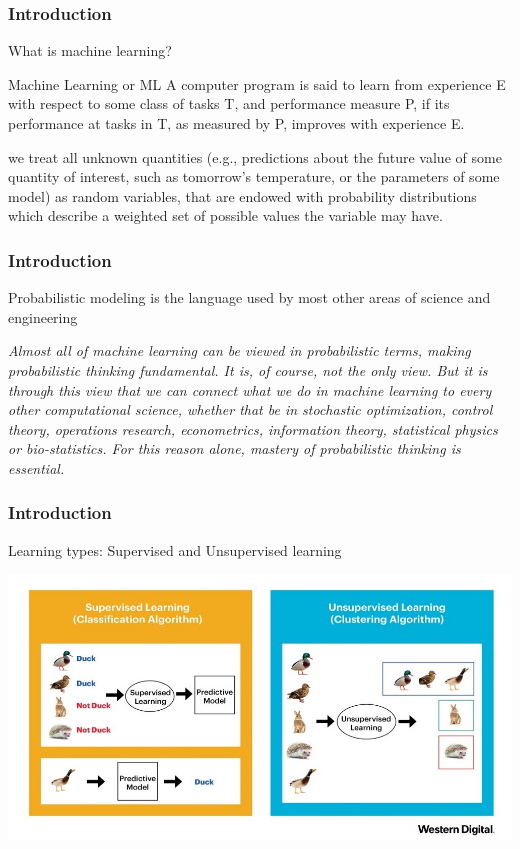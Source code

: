 \documentclass[spanish]{beamer}
\begin{document}
\begin{frame}
\frametitle{Introduction}
What is machine learning?

\begin{block}{Machine Learning or ML}
A computer program is said to learn from experience E with respect to some class of tasks T,
and performance measure P, if its performance at tasks in T, as measured by P, improves with
experience E.
\end{block}
we treat all unknown quantities (e.g., predictions about the future value of some quantity of interest, such as tomorrow’s temperature, or the parameters of some
model) as random variables, that are endowed with probability distributions which describe a weighted set of possible values the variable may have.
\end{frame}
\begin{frame}
\frametitle{Introduction}
Probabilistic modeling is the language used by most other areas of science and engineering

\begin{center}
\textit{Almost all of machine learning can be viewed in probabilistic terms, making probabilistic
thinking fundamental. It is, of course, not the only view. But it is through this view that we
can connect what we do in machine learning to every other computational science, whether that
be in stochastic optimization, control theory, operations research, econometrics, information
theory, statistical physics or bio-statistics. For this reason alone, mastery of probabilistic
thinking is essential.}
\end{center}
\end{frame}
\begin{frame}
\frametitle{Introduction}
Learning types: Supervised and Unsupervised learning
\begin{center}
\includegraphics[scale=0.35]{im1}
\end{center}


\end{frame}
\end{document}

